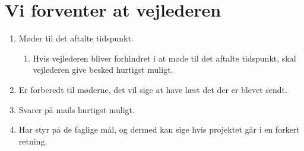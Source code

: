 \section{Vi forventer at vejlederen}
\begin{enumerate}
\item Møder til det aftalte tidspunkt.
\begin{enumerate}
\item Hvis vejlederen bliver forhindret i at møde til det aftalte tidspunkt, skal vejlederen give besked hurtigst muligt.
\end{enumerate}
\item Er forberedt til møderne, det vil sige at have læst det der er blevet sendt.
\item Svarer på mails hurtigst muligt.
\item Har styr på de faglige mål, og dermed kan sige hvis projektet går i en forkert retning.
\end{enumerate}